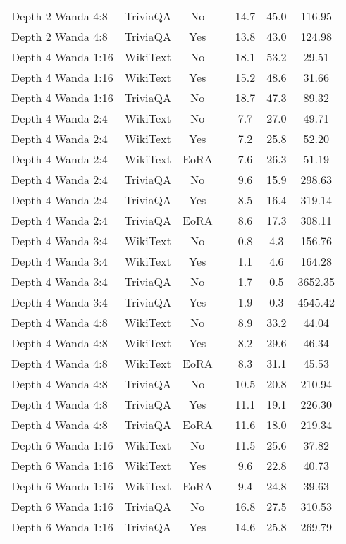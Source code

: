 \begin{longtable}{lcclccc}
Depth 2 Wanda 4:8 & TriviaQA & No & & 14.7 & 45.0 & 116.95 \\
Depth 2 Wanda 4:8 & TriviaQA & Yes & & 13.8 & 43.0 & 124.98 \\
Depth 4 Wanda 1:16 & WikiText & No & & 18.1 & 53.2 & 29.51 \\
Depth 4 Wanda 1:16 & WikiText & Yes & & 15.2 & 48.6 & 31.66 \\
Depth 4 Wanda 1:16 & TriviaQA & No & & 18.7 & 47.3 & 89.32 \\
Depth 4 Wanda 2:4 & WikiText & No & & 7.7 & 27.0 & 49.71 \\
Depth 4 Wanda 2:4 & WikiText & Yes & & 7.2 & 25.8 & 52.20 \\
Depth 4 Wanda 2:4 & WikiText & EoRA & & 7.6 & 26.3 & 51.19 \\
Depth 4 Wanda 2:4 & TriviaQA & No & & 9.6 & 15.9 & 298.63 \\
Depth 4 Wanda 2:4 & TriviaQA & Yes & & 8.5 & 16.4 & 319.14 \\
Depth 4 Wanda 2:4 & TriviaQA & EoRA & & 8.6 & 17.3 & 308.11 \\
Depth 4 Wanda 3:4 & WikiText & No & & 0.8 & 4.3 & 156.76 \\
Depth 4 Wanda 3:4 & WikiText & Yes & & 1.1 & 4.6 & 164.28 \\
Depth 4 Wanda 3:4 & TriviaQA & No & & 1.7 & 0.5 & 3652.35 \\
Depth 4 Wanda 3:4 & TriviaQA & Yes & & 1.9 & 0.3 & 4545.42 \\
Depth 4 Wanda 4:8 & WikiText & No & & 8.9 & 33.2 & 44.04 \\
Depth 4 Wanda 4:8 & WikiText & Yes & & 8.2 & 29.6 & 46.34 \\
Depth 4 Wanda 4:8 & WikiText & EoRA & & 8.3 & 31.1 & 45.53 \\
Depth 4 Wanda 4:8 & TriviaQA & No & & 10.5 & 20.8 & 210.94 \\
Depth 4 Wanda 4:8 & TriviaQA & Yes & & 11.1 & 19.1 & 226.30 \\
Depth 4 Wanda 4:8 & TriviaQA & EoRA & & 11.6 & 18.0 & 219.34 \\
Depth 6 Wanda 1:16 & WikiText & No & & 11.5 & 25.6 & 37.82 \\
Depth 6 Wanda 1:16 & WikiText & Yes & & 9.6 & 22.8 & 40.73 \\
Depth 6 Wanda 1:16 & WikiText & EoRA & & 9.4 & 24.8 & 39.63 \\
Depth 6 Wanda 1:16 & TriviaQA & No & & 16.8 & 27.5 & 310.53 \\
Depth 6 Wanda 1:16 & TriviaQA & Yes & & 14.6 & 25.8 & 269.79 \\

\end{longtable}
